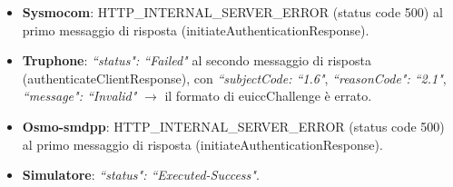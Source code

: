 \documentclass[10pt, oneside]{book}
\begin{document}
\begin{itemize}
\item \textbf{Sysmocom}: HTTP\_INTERNAL\_SERVER\_ERROR (status code 500) al primo messaggio di risposta (initiateAuthenticationResponse).
\item \textbf{Truphone}: \textit{``status": ``Failed"} al secondo messaggio di risposta (authenticateClientResponse), con \textit{``subjectCode: ``1.6"}, \textit{``reasonCode": ``2.1"}, \textit{``message": ``Invalid"} $\rightarrow$ il formato di euiccChallenge è errato.
\item \textbf{Osmo-smdpp}: HTTP\_INTERNAL\_SERVER\_ERROR (status code 500) al primo messaggio di risposta (initiateAuthenticationResponse).
\item \textbf{Simulatore}: \textit{``status": ``Executed-Success"}.
\end{itemize}
\end{document}

